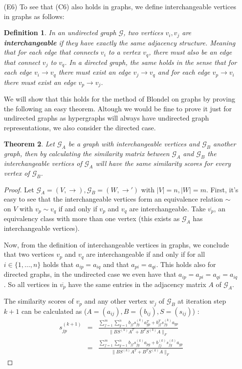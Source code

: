 \documentclass[a4paper,11pt]{report}
\newtheorem{theorem}{Theorem}[section]
\newtheorem{definition}[theorem]{Definition}
\newcommand{\graf}{\mathscr{G}}
\begin{document}
\begin{itemize}
  \item[(E6)]  To see that (C6) also holds in graphs, we define interchangeable vertices in graphs 
  as follows:
  \begin{definition} In an undirected graph $\graf$, two vertices $v_i, v_j$ are \textbf{interchangeable} if they have exactly the same 
  adjacency structure. Meaning that for each edge that connects $v_i$ to a vertex $v_q$, there must also 
  be an edge that connect $v_j$ to $v_q$.  In a directed graph, the same holds 
  in the sense that for each edge $v_i \to v_q$ there must exist an edge $v_j \to v_q$ 
  and for each edge $v_p \to v_i$ there must exist an edge $v_p \to v_j$.
  \end{definition}
  We will show that this holds for the method of Blondel on graphs by proving the 
  following an easy theorem. Altough we would be fine to prove it just for undirected graphs as hypergraphs
  will always have undirected graph representations, we also consider the 
  directed case.
 \begin{theorem}
    Let $\graf_A$ be a graph with interchangeable vertices and $\graf_B$ another 
    graph, then by calculating the similarity matrix between $\graf_A$ and 
    $\graf_B$ the interchangeable vertices of $\graf_A$ will have the same similarity scores for every vertex of $\graf_B$. 
  \end{theorem}
  \begin{proof}
    Let $\graf_A = (V,\to), \graf_B = (W,\to')$ with $|V|=n, |W|=m$. First, it's easy to see that the interchangeable vertices form an equivalence relation $\sim$ on 
    $V$ with $v_p \sim v_q$ if and only if $v_p$ and $v_q$ are interchangeable. 
    Take $\overline{v_p}$, an equivalency class with more than one vertex (this exists as $\graf_A$ has interchangeable 
    vertices).  
    
    Now, from the definition of interchangeable vertices in graphs, we conclude 
    that two vertices $v_p$ and $v_q$ are interchangeable if and only if for all $i \in \{1,\ldots,n\}$ 
    holds that $a_{ip} = a_{iq}$ and 
    that $a_{pi} = a_{qi}$. This holds also for directed graphs, in the 
    undirected case we even have that $a_{ip} = a_{pi} = a_{qi} = a_{iq}$. So 
    all vertices in $\overline{v_p}$ have the same entries in the adjacency matrix $A$ of $\graf_A$. 
    
    
   The similarity scores of $v_p$ and any other vertex $w_j$  of 
    $\graf_B$ at iteration step $k+1$ can be calculated as ($A = (a_{ij}), B=(b_{ij}), S=(s_{ij})$) :
    \begin{eqnarray}
      s^{(k+1)}_{jp} &=& \frac{\sum^m_{f=1}\sum^n_{g=1} b_{jf}s^{(k)}_{fg}a^T_{gp} + 
    b^T_{jf}s^{(k)}_{fg}a_{gp} }{\|BS^{(k)}A^T + B^TS^{(k)}A\|_F}\\
    &=& \frac{\sum^m_{f=1}\sum^n_{g=1} b_{jf}s^{(k)}_{fg}a_{pg} + 
    b_{fj}^{(k)}s^{(k)}_{fg}a_{gp} }{\|BS^{(k)}A^T + B^TS^{(k)}A\|_F}\label{uitgeschrevenblondel2}
    \end{eqnarray}
   

\end{proof}
\end{itemize}
\end{document}
